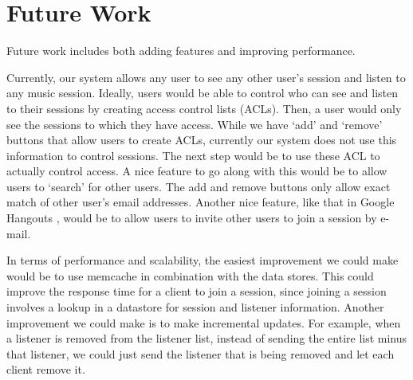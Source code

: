 \section{Future Work}
\label{sec:futurework}
Future work includes both adding features and improving performance.

Currently, our system allows any user to see any other user's session 
and listen to any music session. Ideally, users would be able to control 
who can see and listen to their sessions by creating 
access control lists (ACLs). Then, a user would only see 
the sessions to which they have access. While we have `add' and `remove' 
buttons that allow users to create ACLs, currently our system does not 
use this information to control sessions. The next step would be to 
use these ACL to actually control access. A nice feature to go along with this 
would be to allow users to `search' for other users. The add and remove 
buttons only allow exact match of other user's email addresses. Another nice feature, 
like that in Google Hangouts \cite{googlehangouts}, would be to allow users to 
invite other users to join a session by e-mail. 

In terms of performance and scalability, the easiest improvement we could make would be 
to use memcache in combination with the data stores. This could improve 
the response time for a client to join a session, since joining a session 
involves a lookup in a datastore for session and listener information. 
Another improvement we could make is to make incremental updates. For example,
when a listener is removed from the listener list, instead of sending the entire 
list minus that listener, we could just send the listener that is being removed and let 
each client remove it. 

